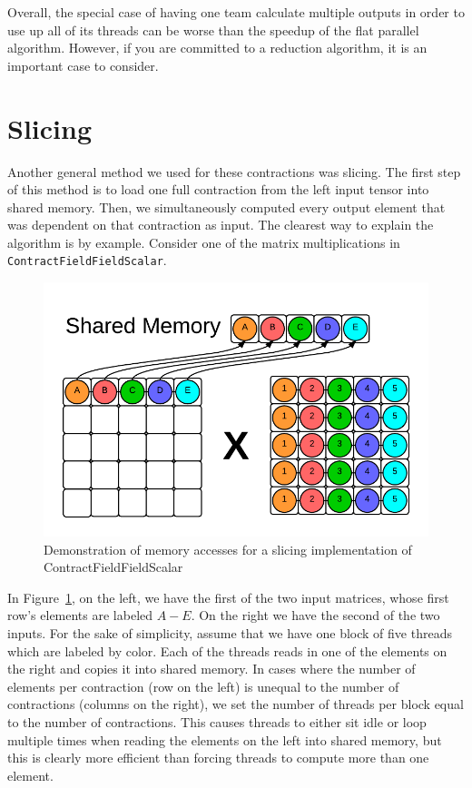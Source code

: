 Overall, the special case of having one team calculate multiple outputs in
order to use up all of its threads can be worse than the speedup of the flat
parallel algorithm. However, if you are committed to a reduction algorithm,
it is an important case to consider. 

\section{Slicing} \label{slicing}
Another general method we used for these contractions was slicing. The first
step of this method is to load one full contraction from the left input tensor into
shared memory. Then, we simultaneously computed every output element that was
dependent on that contraction as input. The clearest way to explain the
algorithm is by example. Consider one of the matrix multiplications in
\texttt{ContractFieldFieldScalar}. 

\begin{figure}
    \centering
    \includegraphics[scale = .55]{ContractFieldFieldScalarGraphic}
    \caption{Demonstration of memory accesses for a slicing implementation of ContractFieldFieldScalar}
\label{fig:Slicing}
\end{figure}

    In Figure~\ref{fig:Slicing}, on the left, we have the first of the two input matrices, whose first row's
elements are labeled $A-E$. On the right we have the second of the two inputs.
For the sake of simplicity, assume that we have one block of five threads which
are labeled by color. Each of the threads reads in one of the elements on the
right and copies it into shared memory. In cases where the number of elements
per contraction (row on the left) is unequal to the number of contractions
(columns on the right), we set the number of threads per block equal to the
number of contractions. This causes threads to either sit idle or loop multiple
times when reading the elements on the left into shared memory, but this is
clearly more efficient than forcing threads to compute more than one element.
	

